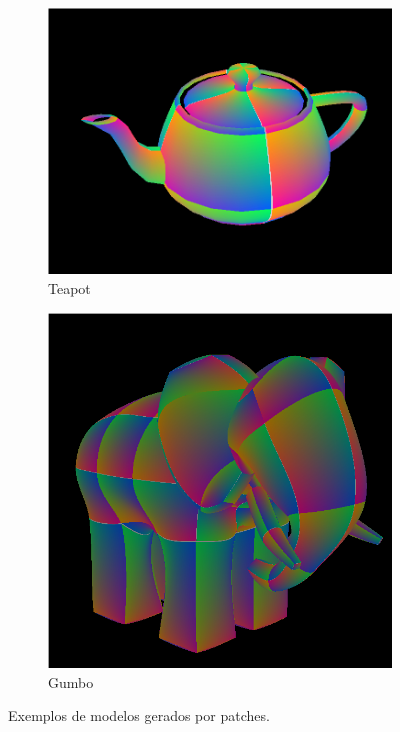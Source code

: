 \documentclass[a4paper]{article}
\begin{document}
\begin{figure}[H]
    \centering
    \begin{subfigure}{0.4\textwidth}
        \includegraphics[width=\textwidth]{./teapot.png}
        \caption{Teapot}
    \end{subfigure}
    \begin{subfigure}{0.4\textwidth}
        \includegraphics[width=\textwidth]{./gumbo.png}
        \caption{Gumbo}
    \end{subfigure}
    \caption{Exemplos de modelos gerados por patches.}
\end{figure}
\end{document}
